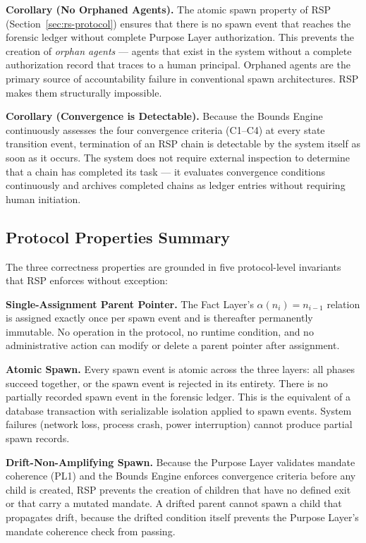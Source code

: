 \medskip
\noindent\textbf{Corollary (No Orphaned Agents).} The atomic spawn property of RSP (Section~\ref{sec:rs-protocol}) ensures that there is no spawn event that reaches the forensic ledger without complete Purpose Layer authorization. This prevents the creation of \emph{orphan agents} — agents that exist in the system without a complete authorization record that traces to a human principal. Orphaned agents are the primary source of accountability failure in conventional spawn architectures. RSP makes them structurally impossible.

\medskip
\noindent\textbf{Corollary (Convergence is Detectable).} Because the Bounds Engine continuously assesses the four convergence criteria (C1–C4) at every state transition event, termination of an RSP chain is detectable by the system itself as soon as it occurs. The system does not require external inspection to determine that a chain has completed its task — it evaluates convergence conditions continuously and archives completed chains as ledger entries without requiring human initiation.

\subsection{Protocol Properties Summary}
\label{sec:rs-properties-summary}

The three correctness properties are grounded in five protocol-level invariants that RSP enforces without exception:

\bigskip
\noindent\textbf{Single-Assignment Parent Pointer.} The Fact Layer's $\alpha(n_i) = n_{i-1}$ relation is assigned exactly once per spawn event and is thereafter permanently immutable. No operation in the protocol, no runtime condition, and no administrative action can modify or delete a parent pointer after assignment.

\bigskip
\noindent\textbf{Atomic Spawn.} Every spawn event is atomic across the three layers: all phases succeed together, or the spawn event is rejected in its entirety. There is no partially recorded spawn event in the forensic ledger. This is the equivalent of a database transaction with serializable isolation applied to spawn events. System failures (network loss, process crash, power interruption) cannot produce partial spawn records.

\bigskip
\noindent\textbf{Drift-Non-Amplifying Spawn.} Because the Purpose Layer validates mandate coherence (PL1) and the Bounds Engine enforces convergence criteria before any child is created, RSP prevents the creation of children that have no defined exit or that carry a mutated mandate. A drifted parent cannot spawn a child that propagates drift, because the drifted condition itself prevents the Purpose Layer's mandate coherence check from passing.

